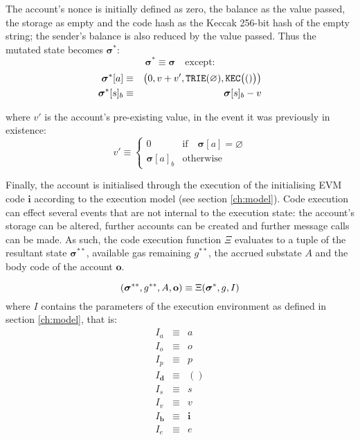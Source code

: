 \documentclass[9pt,oneside]{amsart}
\begin{document}
\begin{multicols}{2}
The account's nonce is initially defined as zero, the balance as the value passed, the storage as empty and the code hash as the Keccak 256-bit hash of the empty string; the sender's balance is also reduced by the value passed. Thus the mutated state becomes $\boldsymbol{\sigma}^*$:
\begin{equation}
\boldsymbol{\sigma}^* \equiv \boldsymbol{\sigma} \quad \text{except:}
\end{equation}
\begin{eqnarray}
\boldsymbol{\sigma}^*[a] &\equiv& \big( 0, v + v', \mathtt{\tiny TRIE}(\varnothing), \mathtt{\tiny KEC}\big(()\big) \big) \\
\boldsymbol{\sigma}^*[s]_b &\equiv& \boldsymbol{\sigma}[s]_b - v
\end{eqnarray}

where $v'$ is the account's pre-existing value, in the event it was previously in existence:
\begin{equation}
v' \equiv \begin{cases}
0 & \text{if} \quad \boldsymbol{\sigma}[a] = \varnothing\\
\boldsymbol{\sigma}[a]_b & \text{otherwise}
\end{cases}
\end{equation}


Finally, the account is initialised through the execution of the initialising EVM code $\mathbf{i}$ according to the execution model (see section \ref{ch:model}). Code execution can effect several events that are not internal to the execution state: the account's storage can be altered, further accounts can be created and further message calls can be made. As such, the code execution function $\Xi$ evaluates to a tuple of the resultant state $\boldsymbol{\sigma}^{**}$, available gas remaining $g^{**}$, the accrued substate $A$ and the body code of the account $\mathbf{o}$.

\begin{equation}
(\boldsymbol{\sigma}^{**}, g^{**}, A, \mathbf{o}) \equiv \Xi(\boldsymbol{\sigma}^*, g, I) \\
\end{equation}
where $I$ contains the parameters of the execution environment as defined in section \ref{ch:model}, that is:
\begin{eqnarray}
I_a & \equiv & a \\
I_o & \equiv & o \\
I_p & \equiv & p \\
I_\mathbf{d} & \equiv & () \\
I_s & \equiv & s \\
I_v & \equiv & v \\
I_\mathbf{b} & \equiv & \mathbf{i} \\
I_e & \equiv & e
\end{eqnarray}


\end{multicols}
\end{document}
